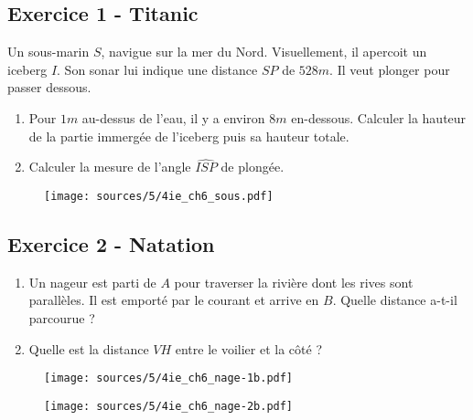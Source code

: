 \documentclass[10pt]{article}
\begin{document}
\subsection*{Exercice 1 - Titanic} 
\begin{multicols}{2}


  Un sous-marin $S$, navigue sur la mer du Nord. Visuellement, il apercoit un iceberg $I$. Son sonar lui indique une distance $SP$ de $528m$. Il veut plonger pour passer dessous.

  \begin{enumerate}
  \item[1.] Pour $1m$ au-dessus de l'eau, il y a environ $8m$ en-dessous. Calculer la hauteur de la partie immergée de l'iceberg puis sa hauteur totale.
  \item[2.] Calculer la mesure de l'angle $\widehat{ISP}$ de plongée.
  \end{enumerate}

  \begin{figure}[H]
    \centering
    \texttt{[image: sources/5/4ie\_ch6\_sous.pdf]}
  \end{figure}
\end{multicols}


\subsection*{Exercice 2 - Natation} 
\begin{multicols}{2}



  \begin{enumerate}
  \item[1.] Un nageur est parti de $A$ pour traverser la rivière dont les rives sont parallèles. Il est emporté par le courant et arrive en $B$. Quelle distance a-t-il parcourue ?

  \item[2.]Quelle est la distance $VH$ entre le voilier et la côté ?
  \end{enumerate}

  \begin{figure}[H]
    \centering
    \texttt{[image: sources/5/4ie\_ch6\_nage-1b.pdf]}
  \end{figure}

  \begin{figure}[H]
    \centering
    \texttt{[image: sources/5/4ie\_ch6\_nage-2b.pdf]}
  \end{figure}
\end{multicols}
\end{document}
